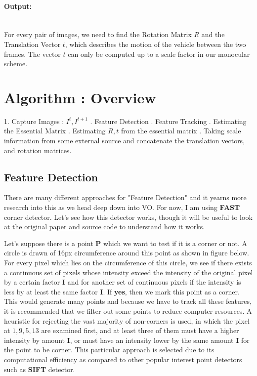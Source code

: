 \documentclass[a4paper,12pt]{extarticle}
\theoremstyle{mytheor}
\begin{document}
\paragraph*{Output:}
\mbox{}\\
For every pair of images, we need to find the Rotation Matrix $R$ and the Translation Vector $t$, which describes the motion of the vehicle between the two frames. The vector $t$ can only be computed up to a scale factor in our monocular scheme.


\section{Algorithm : Overview}

1. Capture Images : $I^t, I^{t+1}$ . Feature Detection . Feature Tracking . Estimating the Essential Matrix . Estimating $R, t$ from the essential matrix . Taking scale information from some external source and concatenate the translation vectors, and rotation matrices. \newline 

\subsection{Feature Detection}

There are many different approaches for "Feature Detection" and it yearns more research into this as we head deep down into VO. For now, I am using \textbf{FAST} corner detector. Let's see how this detector works, though it will be useful to look at the \href{https://www.edwardrosten.com/work/fast.html}{original paper and source code} to understand how it works.


Let's suppose there is a point \textbf{P} which we want to test if it is a corner or not. A circle is drawn of 16px circumference around this point as shown in figure below. For every pixel which lies on the circumference of this circle, we see if there exists a continuous set of pixels whose intensity exceed the intensity of the original pixel by a certain factor \textbf{I} and for another set of continuous pixels if the intensity is less by at least the same factor \textbf{I}. If \textbf{yes}, then we mark this point as a corner. This would generate many points and because we have to track all these features, it is recommended that we filter out some points to reduce computer resources. A heuristic for rejecting the vast majority of non-corners is used, in which the pixel at $1,9,5,13$ are examined first, and at least three of them must have a higher intensity by amount \textbf{I}, or must have an intensity lower by the same amount \textbf{I} for the point to be corner. This particular approach is selected due to its computational efficiency as compared to other popular interest point detectors such as \textbf{SIFT} detector.
\end{document}
